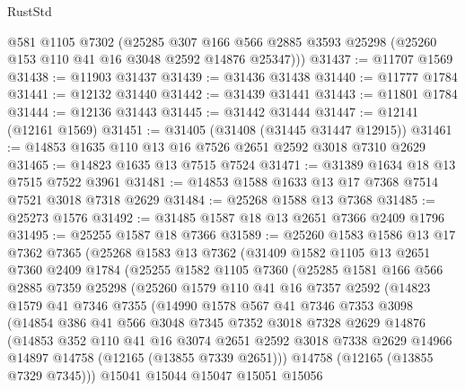 \begin{lexlean}{RustStd}
\begin{coremodule}
      @581
      @1105
      @7302
      (@25285
        @307
        @166
        @566
        @2885
        @3593
        @25298
        (@25260 @153 @110 @41 @16 @3048 @2592 @14876 @25347)))
@31437 := @11707 @1569
@31438 := @11903 @31437
@31439 := @31436 @31438
@31440 := @11777 @1784
@31441 := @12132 @31440
@31442 := @31439 @31441
@31443 := @11801 @1784
@31444 := @12136 @31443
@31445 := @31442 @31444
@31447 := @12141 (@12161 @1569)
@31451 := @31405 (@31408 (@31445 @31447 @12915))
@31461 := @14853 @1635 @110 @13 @16 @7526 @2651 @2592 @3018 @7310 @2629
@31465 := @14823 @1635 @13 @7515 @7524
@31471 := @31389 @1634 @18 @13 @7515 @7522 @3961
@31481 := @14853 @1588 @1633 @13 @17 @7368 @7514 @7521 @3018 @7318 @2629
@31484 := @25268 @1588 @13 @7368
@31485 := @25273 @1576
@31492 := @31485 @1587 @18 @13 @2651 @7366 @2409 @1796
@31495 := @25255 @1587 @18 @7366
@31589 := @25260
    @1583
    @1586
    @13
    @17
    @7362
    @7365
    (@25268
      @1583
      @13
      @7362
      (@31409
        @1582
        @1105
        @13
        @2651
        @7360
        @2409
        @1784
        (@25255
          @1582
          @1105
          @7360
          (@25285
            @1581
            @166
            @566
            @2885
            @7359
            @25298
            (@25260
              @1579
              @110
              @41
              @16
              @7357
              @2592
              (@14823
                @1579
                @41
                @7346
                @7355
                (@14990
                  @1578
                  @567
                  @41
                  @7346
                  @7353
                  @3098
                  (@14854
                    @386
                    @41
                    @566
                    @3048
                    @7345
                    @7352
                    @3018
                    @7328
                    @2629
                    @14876
                    (@14853
                      @352
                      @110
                      @41
                      @16
                      @3074
                      @2651
                      @2592
                      @3018
                      @7338
                      @2629
                      @14966
                      @14897
                      @14758
                      (@12165 (@13855 @7339 @2651)))
                    @14758
                    (@12165 (@13855 @7329 @7345)))
                  @15041
                  @15044
                  @15047
                  @15051
                  @15056

\end{coremodule}
\end{lexlean}
